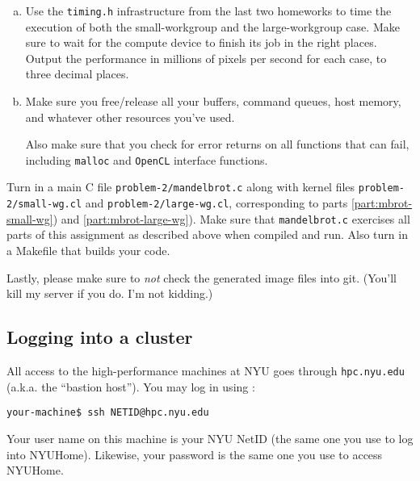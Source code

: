 \documentclass[11pt]{article}
\begin{document}
\begin{enumerate}[a)]
  \item Use the \texttt{timing.h} infrastructure from the last two
    homeworks to time the execution of both the small-workgroup and
    the large-workgroup case. Make sure to wait for the compute device
    to finish its job in the right places. Output the performance in
    millions of pixels per second for each case, to three decimal
    places.

  \item Make sure you free/release all your buffers, command queues, host
    memory, and whatever other resources you've used.

    Also make sure that you check for error returns on all functions
    that can fail, including \texttt{malloc} and \texttt{OpenCL}
    interface functions.
\end{enumerate}

Turn in a main C file \texttt{problem-2/mandelbrot.c} along with kernel files
\texttt{problem-2/small-wg.cl} and \texttt{problem-2/large-wg.cl},
corresponding to parts \ref{part:mbrot-small-wg}) and
\ref{part:mbrot-large-wg}). Make sure that \texttt{mandelbrot.c} exercises all
parts of this assignment as described above when compiled and run.  Also turn
in a Makefile that builds your code.

Lastly, please make sure to \emph{not} check the generated image files
into git. (You'll kill my server if you do. I'm not kidding.)

\clearpage
\subsection*{Logging into a cluster}

All access to the high-performance machines at NYU goes through
\texttt{hpc.nyu.edu} (a.k.a. the ``bastion host''). You may log in using
:
\begin{lstlisting}
your-machine$ ssh NETID@hpc.nyu.edu
\end{lstlisting}%

Your user name on this machine is your NYU NetID (the same one you use
to log into NYUHome). Likewise, your password is the same one you use
to access NYUHome.
\end{document}
